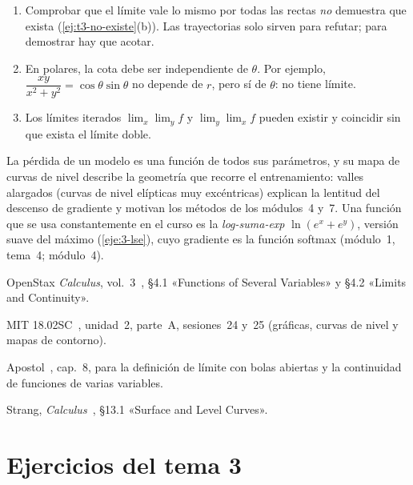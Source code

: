 \begin{observacion}
\begin{enumerate}[label=(\alph*)]
\item Comprobar que el límite vale lo mismo por todas las rectas \emph{no} demuestra que exista (\cref{ej:t3-no-existe}(b)). Las trayectorias solo sirven para refutar; para demostrar hay que acotar.
\item En polares, la cota debe ser independiente de $\theta$. Por ejemplo, $\dfrac{xy}{x^2+y^2}=\cos\theta\sin\theta$ no depende de $r$, pero sí de $\theta$: no tiene límite.
\item Los límites iterados $\lim_x\lim_y f$ y $\lim_y\lim_x f$ pueden existir y coincidir sin que exista el límite doble.
\end{enumerate}
\end{observacion}

\begin{observacion}
La pérdida de un modelo es una función de todos sus parámetros, y su mapa de curvas de nivel describe la geometría que recorre el entrenamiento: valles alargados (curvas de nivel elípticas muy excéntricas) explican la lentitud del descenso de gradiente y motivan los métodos de los módulos~4 y~7. Una función que se usa constantemente en el curso es la \emph{log-suma-exp} $\ln(e^{x}+e^{y})$, versión suave del máximo (\cref{eje:3-lse}), cuyo gradiente es la función softmax (módulo~1, tema~4; módulo~4).
\end{observacion}

\begin{lecturas}
\item OpenStax \emph{Calculus}, vol.~3~\cite{openstax3}, §4.1 «Functions of Several Variables» y §4.2 «Limits and Continuity».
\item MIT 18.02SC~\cite{mit1802}, unidad~2, parte~A, sesiones~24 y~25 (gráficas, curvas de nivel y mapas de contorno).
\item Apostol~\cite{apostol2}, cap.~8, para la definición de límite con bolas abiertas y la continuidad de funciones de varias variables.
\item Strang, \emph{Calculus}~\cite{strangcalc}, §13.1 «Surface and Level Curves».
\end{lecturas}

\section*{Ejercicios del tema 3}


